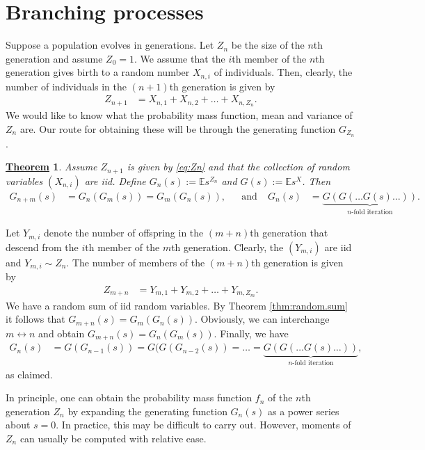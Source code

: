 \documentclass[12pt]{book}
\numberwithin{equation}{chapter}
\theoremstyle{plain}
\newtheorem{theorem}{\underline{Theorem}}
\numberwithin{theorem}{section}
\theoremstyle{definition}
\numberwithin{exercise}{chapter}
\let\oldendproof\endproof
\renewenvironment{proof}[1][\proofname]{%
  \oldproof[\scshape\underline{#1}]%
}{\oldendproof}
\newcommand{\<}{\langle}
\renewcommand{\>}{\rangle}
\renewcommand{\(}{\left(}
\renewcommand{\)}{\right)}
\renewcommand{\[}{\left[}
\renewcommand{\]}{\right]}
\newcommand\Eb{\mathds{E}}
\begin{document}
\section{Branching processes}
\label{sec:branching}

Suppose a population evolves in generations.  Let $Z_n$ be the size of the $n$th generation and assume $Z_0 = 1$.  We assume that the $i$th member of the $n$th generation gives birth to a random number $X_{n,i}$ of individuals.  Then, clearly, the number of individuals in the $(n+1)$th generation is given by
\begin{align}
Z_{n+1}
	&=	X_{n,1} + X_{n,2} + \ldots + X_{n,Z_n} . \label{eq:Zn}
\end{align}
We would like to know what the probability mass function, mean and variance of $Z_n$ are.  Our route for obtaining these will be through the generating function $G_{Z_n}$.

\begin{theorem}
Assume $Z_{n+1}$ is given by \eqref{eq:Zn} and that the collection of random variables $(X_{n,i})$ are iid.  Define $G_n(s) := \Eb s^{Z_n}$ and $G(s) := \Eb s^X$.  Then
\begin{align}
G_{n+m}(s)
	&=	G_n( G_m(s) ) = G_m( G_n(s) ) , &
	&\text{and thus}&
G_n(s)
	&=	\underbrace{ G( G( \ldots G(s) \ldots ) ) }_{ \text{$n$-fold iteration} } .
\end{align}
\end{theorem}

\begin{proof}
Let $Y_{m,i}$ denote the number of offspring in the $(m+n)$th generation that descend from the $i$th member of the $m$th generation.  Clearly, the $(Y_{m,i})$ are iid and $Y_{m,i} \sim Z_n$.  The number of members of the $(m+n)$th generation is given by
\begin{align}
Z_{m+n}
	&=	Y_{m,1} + Y_{m,2} + \ldots + Y_{m,Z_m} .
\end{align}
We have a random sum of iid random variables.
By Theorem \ref{thm:random.sum} it follows that $G_{m+n}(s) =	G_m(G_n(s))$.  Obviously, we can interchange $m \leftrightarrow n$ and obtain $G_{m+n}(s) =	G_n(G_m(s))$.
Finally, we have
\begin{align}
G_n(s)
	&=	G( G_{n-1}(s) )
	=		G( G( G_{n-2}(s) )
	= 	\ldots
	=		\underbrace{ G( G( \ldots G(s) \ldots ) ) }_{ \text{$n$-fold iteration} } ,
\end{align}
as claimed.
\end{proof}

\noindent
In principle, one can obtain the probability mass function $f_n$ of the $n$th generation $Z_n$ by expanding the generating function $G_n(s)$ as a power series about $s=0$.  In practice, this may be difficult to carry out.  However, moments of $Z_n$ can usually be computed with relative ease.
\end{document}
